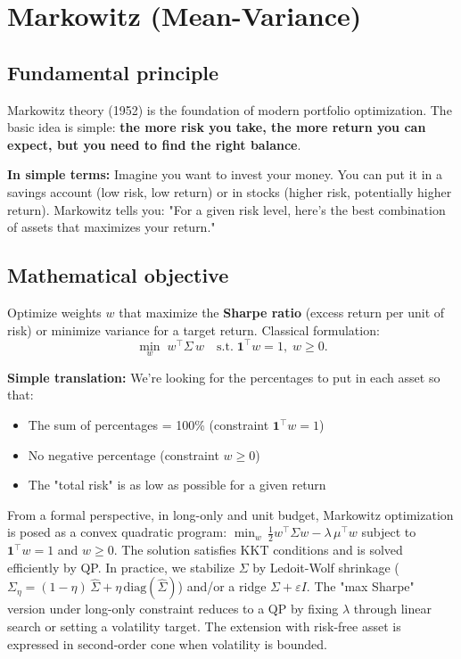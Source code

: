 \documentclass[11pt,a4paper]{article}
\begin{document}
\section{Markowitz (Mean-Variance)}

\subsection{Fundamental principle}
Markowitz theory (1952) is the foundation of modern portfolio optimization. The basic idea is simple: \textbf{the more risk you take, the more return you can expect, but you need to find the right balance}.

\textbf{In simple terms:} Imagine you want to invest your money. You can put it in a savings account (low risk, low return) or in stocks (higher risk, potentially higher return). Markowitz tells you: "For a given risk level, here's the best combination of assets that maximizes your return."

\subsection{Mathematical objective}
Optimize weights \(w\) that maximize the \textbf{Sharpe ratio} (excess return per unit of risk) or minimize variance for a target return. Classical formulation:
 \[\min_{w} \; w^\top \Sigma \, w \quad \text{s.t.} \; \mathbf{1}^\top w = 1,\; w \ge 0.\]

\textbf{Simple translation:} We're looking for the percentages to put in each asset so that:
\begin{itemize}
\item The sum of percentages = 100\% (constraint \(\mathbf{1}^\top w = 1\))
\item No negative percentage (constraint \(w \ge 0\))
\item The "total risk" is as low as possible for a given return
\end{itemize}
\noindent From a formal perspective, in long-only and unit budget, Markowitz optimization is posed as a convex quadratic program: \(\min_w\, \frac{1}{2} w^\top \Sigma w - \lambda \, \mu^\top w\) subject to \(\mathbf{1}^\top w=1\) and \(w\ge 0\). The solution satisfies KKT conditions and is solved efficiently by QP. In practice, we stabilize \(\Sigma\) by Ledoit-Wolf shrinkage (\(\Sigma_\eta=(1-\eta)\,\hat\Sigma + \eta \, \text{diag}(\hat\Sigma)\)) and/or a ridge \(\Sigma+\varepsilon I\). The "max Sharpe" version under long-only constraint reduces to a QP by fixing \(\lambda\) through linear search or setting a volatility target. The extension with risk-free asset is expressed in second-order cone when volatility is bounded.
\end{document}
